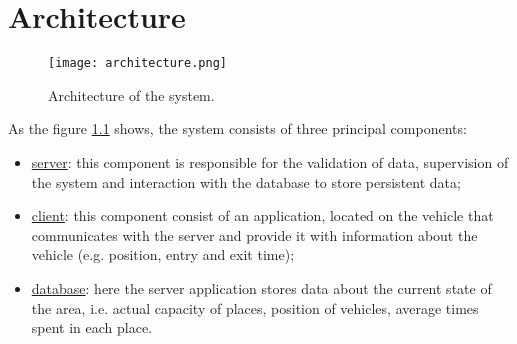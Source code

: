\chapter{Architecture}\label{Chap:Architecture}
\begin{figure}[!htb]
   \centering
   \texttt{[image: architecture.png]}
   \caption{Architecture of the system.}\label{Fig:ArchNoImpl}
\end{figure}
As the figure \ref{Fig:ArchNoImpl} shows, the system consists of three principal components:
\begin{itemize}
  \item \underline{server}: this component is responsible for the validation of data, supervision of the system and interaction with the database
    to store persistent data;
  \item \underline{client}: this component consist of an application, located on the vehicle that communicates with the server and provide it with
    information about the vehicle (e.g. position, entry and exit time);
  \item \underline{database}: here the server application stores data about the current state of the area, i.e. actual capacity of places, position of vehicles,
  average times spent in each place.
\end{itemize}
